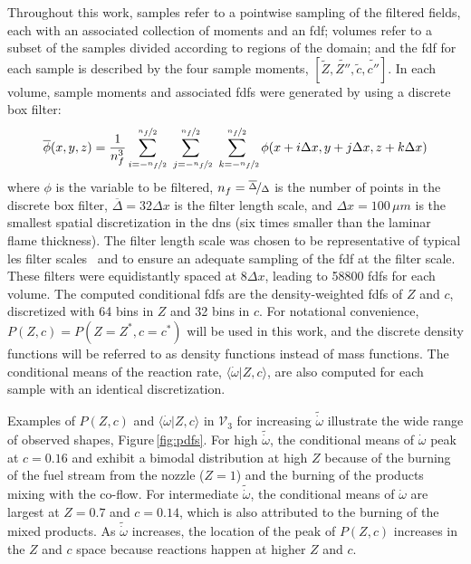 \documentclass[review]{elsarticle}
\newcommand{\wt}[1]{\widetilde{#1}}
\newcommand{\ol}[1]{\overline{#1}}
\begin{document}
Throughout this work, samples refer to a pointwise sampling of the
filtered fields, each with an associated collection of moments and an
\gls{fdf}; volumes refer to a subset of the samples divided according
to regions of the domain; and the \gls{fdf} for each sample is
described by the four sample moments,
$\left[\wt{Z}, \wt{Z''}, \wt{c}, \wt{c''}\right]$. In each volume,
sample moments and associated \glspl{fdf} were generated by
using a discrete box filter:
\begin{align}
  \label{eq:box}
  \ol{\phi} (x, y, z) = \frac{1}{n_f^3}\sum_{i=-\nicefrac{n_f}{2}}^{\nicefrac{n_f}{2}} \sum_{~j=-\nicefrac{n_f}{2}}^{\nicefrac{n_f}{2}} \sum_{~k=-\nicefrac{n_f}{2}}^{\nicefrac{n_f}{2}} \phi(x + i \Delta x, y + j \Delta x, z + k \Delta x) 
\end{align}
where $\phi$ is the variable to be filtered,
$n_f = \nicefrac{\ol{\Delta}}{\Delta}$ is the number of points in the
discrete box filter, $\ol{\Delta} = 32 \Delta x$ is the filter length
scale, and $\Delta x = 100 \,\unit{\mu m}$ is the smallest spatial
discretization in the \gls{dns} (six times smaller than the laminar
flame thickness). The filter length scale was chosen to be
representative of typical \gls{les} filter scales~\cite{Pitsch2006a}
and to ensure an adequate sampling of the \gls{fdf} at the filter
scale. These filters were equidistantly spaced at $8\Delta x$, leading
to 58800 \glspl{fdf} for each volume. The computed
conditional \glspl{fdf} are the density-weighted
\glspl{fdf} of $Z$ and $c$, discretized with 64 bins in $Z$ and 32
bins in $c$. For notational convenience, $P(Z,c) = P(Z = Z^*, c=c^*)$
will be used in this work, and the discrete density functions will be
referred to as density functions instead of mass functions. The
conditional means of the reaction rate,
$\langle \dot{\omega} | Z, c \rangle$, are also computed for each
sample with an identical discretization.

Examples of $P(Z,c)$ and $\langle \dot{\omega} | Z, c \rangle$ in
$\mathcal{V}_3$ for increasing $\wt{\dot{\omega}}$ illustrate the wide
range of observed shapes, Figure\,\ref{fig:pdfs}. For high
$\wt{\dot{\omega}}$, the conditional means of $\dot{\omega}$ peak at
$c=0.16$ and exhibit a bimodal distribution at high $Z$ because of the
burning of the fuel stream from the nozzle ($Z=1$) and the burning of
the products mixing with the co-flow. For intermediate
$\wt{\dot{\omega}}$, the conditional means of $\dot{\omega}$ are
largest at $Z=0.7$ and $c=0.14$, which is also attributed to the
burning of the mixed products. As $\wt{\dot{\omega}}$ increases, the
location of the peak of $P(Z, c)$ increases in the $Z$ and $c$ space
because reactions happen at higher $Z$ and $c$.
\end{document}
